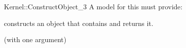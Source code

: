 \begin{ccRefFunctionObjectConcept}{Kernel::ConstructObject_3}
A model for this must provide:


{constructs an object that contains  and returns it.}

\ccRefines
{} (with one argument)

\ccSeeAlso
{} \\
 \\
 \\
 \\
 \\
 \\

\end{ccRefFunctionObjectConcept}
